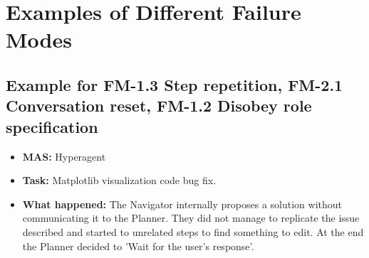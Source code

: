 \section{Examples of Different Failure Modes}
\label{appendix:examples}

\subsection{Example for FM-1.3 Step repetition, FM-2.1 Conversation reset, FM-1.2 Disobey role specification}\label{ex:fm2.2}

\begin{itemize}
    \item \textbf{MAS:} Hyperagent
    \item \textbf{Task:} Matplotlib visualization code bug fix.
    \item \textbf{What happened:} The Navigator internally proposes a solution without communicating it to the Planner. They did not manage to replicate the issue described and started to unrelated steps to find something to edit. At the end the Planner decided to 'Wait for the user's response'. 


\end{itemize}
